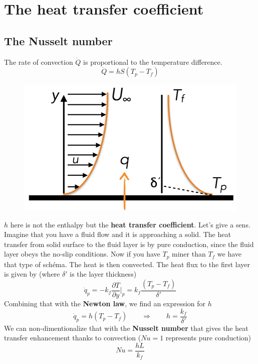 \section{The heat transfer coefficient}
	\subsection{The Nusselt number}
	\label{subsec:5.3.1}
	The rate of convection $\dot{Q}$ is proportional to the temperature difference. 
	\begin{equation}
		\dot{Q} = h S(T_p - T_f)
	\end{equation}		
	\begin{figure}
	\vspace{-15mm}
	\includegraphics[scale=0.25]{ch5/3}
	\end{figure}	
	$h$ here is not the enthalpy but the \textbf{heat transfer coefficient}. Let’s give a sens. Imagine that you have a fluid flow and it is approaching a solid. The heat transfer from solid surface to the fluid layer is by pure conduction, since the fluid layer obeys the no-slip conditions. Now if you have $T_p$ miner than $T_f$ we have that type of schéma. The heat is then convected. The heat flux to the first layer is given by (where $\delta '$ is the layer thickness)
	\begin{equation}
		\dot{q}_p = -k_f \frac{\partial T}{\partial y}|_p = k_f\frac{(T_p-T_f)}{\delta '}
	\end{equation}
	Combining that with the \textbf{Newton law}, we find an expression for $h$
	\begin{equation}
		\dot{q}_p = h(T_p-T_f) \qquad \Rightarrow \qquad h = \frac{k_f}{\delta '}
	\end{equation}
 	We can non-dimentionalize that with the \textbf{Nusselt number} that gives the heat transfer enhancement thanks to convection ($Nu = 1$ represents pure conduction)
 	\begin{equation}
 		Nu = \frac{hL}{k_f}
 	\end{equation}
	
